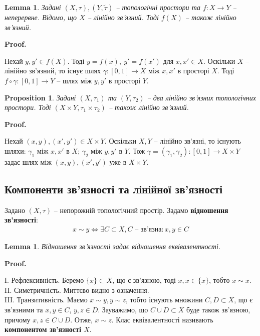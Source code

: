 \documentclass[a4paper, 10pt]{article}
\makeatletter
\theoremstyle{theoremdd}
\newtheorem{proposition}[theorem]{Proposition}
\newtheorem{lemma}[theorem]{Lemma}
\renewenvironment{proof}[1][Proof.\\]{\par
\pushQED{\hfill \qed}%
\normalfont \topsep6\p@\@plus6\p@\relax
\trivlist
\item\relax
{\bfseries
#1\@addpunct{.}}\hspace\labelsep\ignorespaces
}{%
\popQED\endtrivlist\@endpefalse
}
\makeatother
\begin{document}
\begin{lemma}
Задані $(X,\tau), (Y,\tilde{\tau})$ -- топологічні простори та $f \colon X \to Y$ -- неперервне. Відомо, що $X$ -- лінійно зв'язний. Тоді $f(X)$ -- також лінійно зв'язний.
\end{lemma}

\begin{proof}
Нехай $y,y' \in f(X)$. Тоді $y = f(x),\ y' = f(x')$ для $x,x' \in X$. Оскільки $X$ -- лінійно зв'язний, то існує шлях $\gamma \colon [0,1] \to X$ між $x,x'$ в просторі $X$. Тоді $f \circ\gamma \colon [0,1] \to Y$ -- шлях між $y,y'$ в просторі $Y$.
\end{proof}

\begin{proposition}
Задані $(X,\tau_1)$ та $(Y,\tau_2)$ -- два лінійно зв'язних топологічних простори. Тоді $(X \times Y, \tau_1 \times \tau_2)$ -- також лінійно зв'язний.
\end{proposition}

\begin{proof}
Нехай $(x,y), (x',y') \in X \times Y$. Оскільки $X,Y$ -- лінійно зв'язні, то існують шляхи: $\gamma_1$ між $x,x'$ в $X$; $\gamma_2$ між $y,y'$ в $Y$. Тож $\gamma = (\gamma_1, \gamma_2) \colon [0,1] \to X \times Y$ задає шлях між $(x,y), (x',y')$ уже в $X \times Y$.
\end{proof}

\subsection{Компоненти зв'язності та лінійної зв'язності}
Задано $(X,\tau)$ -- непорожній топологічний простір. Задамо \textbf{відношення зв'язності}:
\begin{align*}
x \sim y \iff \exists C \subset X,  C \text{ -- зв'язна}: x,y \in C
\end{align*}

\begin{lemma}
Відношення зв'язності задає відношення еквівалентності.
\end{lemma}

\begin{proof}
I. Рефлексивність. Беремо $\{x\} \subset X$, що є зв'язною, тоді $x,x \in \{x\}$, тобто $x \sim x$.\\
II. Симетричність. Миттєво видно з означення.\\
III. Транзитивність. Маємо $x \sim y, y \sim z$, тобто існують множини $C, D \subset X$, що є зв'язними та $x,y \in C$, $y,z \in D$. Зауважимо, що $C \cup D \subset X$ буде також зв'язною, причому $x,z \in C \cup D$. Отже, $x \sim z$.
\end{proof}
\noindent
Клас еквівалентності називають \textbf{компонентом зв'язності $X$}.
\end{document}
